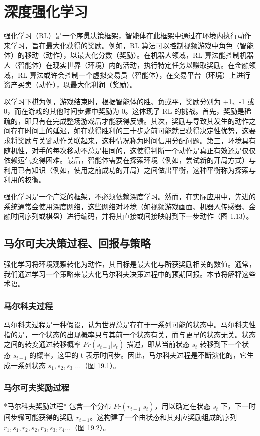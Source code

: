 \chapter{深度强化学习}

强化学习（RL）是一个序贯决策框架，智能体在此框架中通过在环境内执行动作来学习，旨在最大化获得的奖励。例如，RL 算法可以控制视频游戏中角色（智能体）的移动（动作），以最大化分数（奖励）。在机器人领域，RL 算法能控制机器人（智能体）在现实世界（环境）内的活动，执行特定任务以赚取奖励。在金融领域，RL 算法或许会控制一个虚拟交易员（智能体），在交易平台（环境）上进行资产买卖（动作），以最大化利润（奖励）。

以学习下棋为例，游戏结束时，根据智能体的胜、负或平，奖励分别为 +1、-1 或 0，而在游戏的其他时间步骤中奖励为 0。这体现了 RL 的挑战。首先，奖励是稀疏的，即只有在完成整场游戏后才能获得反馈。其次，奖励与导致其发生的动作之间存在时间上的延迟，如在获得胜利的三十步之前可能就已获得决定性优势，这要求将奖励与关键动作关联起来，这种情况称为时间信用分配问题。第三，环境具有随机性，对手的每次移动不总是相同的，这使得判断一个动作是真正有效还是仅仅依赖运气变得困难。最后，智能体需要在探索环境（例如，尝试新的开局方式）与利用已有知识（例如，使用之前成功的开局）之间做出平衡，这种平衡称为探索与利用的权衡。

强化学习是一个广泛的框架，不必须依赖深度学习。然而，在实际应用中，先进的系统通常会使用深度网络，这些网络对环境（如视频游戏画面、机器人传感器、金融时间序列或棋盘）进行编码，并将其直接或间接映射到下一步动作（图 1.13）。


\section{马尔可夫决策过程、回报与策略}
强化学习将环境观察转化为动作，其目标是最大化与所获奖励相关的数值。通常，我们通过学习一个策略来最大化马尔科夫决策过程中的预期回报。本节将解释这些术语。

\subsection{马尔科夫过程}
马尔科夫过程是一种假设，认为世界总是存在于一系列可能的状态中。马尔科夫性指的是，一个状态的出现概率只与其前一个状态有关，而与更早的状态无关。状态之间的转变通过转移概率 \(Pr(s_{t+1}|s_t)\) 描述，即从当前状态 \(s_t\) 转移到下一个状态 \(s_{t+1}\) 的概率，这里的 t 表示时间步。因此，马尔科夫过程是不断演化的，它生成一系列状态 \(s_1, s_2, s_3\) ...（图 19.1）。

\subsection{马尔可夫奖励过程}
*马尔科夫奖励过程* 包含一个分布 \(Pr(r_{t+1}|s_t)\)，用以确定在状态 \(s_t\) 下，下一时间步骤可能获得的奖励 \(r_{t+1}\)。这构建了一个由状态和其对应奖励组成的序列 \(r_1, s_1, r_2, s_2, r_3, s_3, r_4 \ldots\)（图 19.2）。

